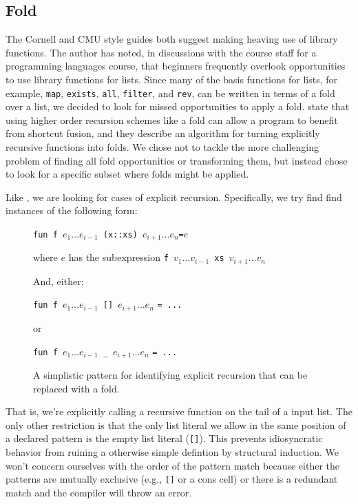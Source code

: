 \documentclass[12pt,abstracton]{scrartcl}
\begin{document}
\subsection{Fold}\label{subsec:fold}
The Cornell and CMU style guides both suggest making heaving use of library functions.
The author has noted, in discussions with the course staff for a programming languages course,
that beginners frequently overlook opportunities to
use library functions for lists. Since many of the basis functions
for lists, for example, \texttt{map}, \texttt{exists}, \texttt{all}, \texttt{filter},
and \texttt{rev}, can be written in terms of a fold over a list, we decided to look
for missed opportunities to apply a fold.
\cite{Jeu13} state that using higher order recursion schemes like a fold can allow a program
to benefit from shortcut fusion, and they
describe an algorithm for turning
explicitly recursive functions into folds.
We chose not to tackle the more challenging
problem of finding all fold opportunities or transforming them,
but instead chose to look for a specific
subset where folds might be applied.

Like \cite{Jeu13}, we are looking for cases of explicit recursion. Specifically, we try find
find instances of the following form:

\begin{figure}[!h]
\begin{center}
\texttt{fun f }\(e_{1}\ldots e_{i-1}\)\texttt{ (x::xs) }\(e_{i+1}\ldots e_{n}\)\texttt{=}\(e\)

where $e$ has the subexpression \texttt{f }\(v_{1}\ldots v_{i-1}\)\texttt{ xs }\(v_{i+1}\ldots v_{n}\)

And, either:

\texttt{fun f }\(e_{1}\ldots e_{i-1}\)\texttt{ [] }\(e_{i+1}\ldots e_{n}\) \texttt{= ...}

or

\texttt{fun f }\(e_{1}\ldots e_{i-1}\)\texttt{ \_ }\(e_{i+1}\ldots e_{n}\) \texttt{= ...}

\end{center}
\caption{A simplistic pattern for identifying explicit recursion that can be replaced with a fold.}
\label{fig:folddef}
\end{figure}

That is, we're explicitly calling a recursive function on the tail of a input list.
The only other restriction is that the only list literal we allow in the same position of
a declared pattern is the empty list literal (\texttt{[]}). This prevents idiosyncratic
behavior from ruining a otherwise simple defintion by structural induction.
We won't concern ourselves with the order of the pattern match because either the patterns
are mutually exclusive (e.g., \texttt{[]} or a cons cell) or there is a redundant match
and the compiler will throw an error.
\end{document}
